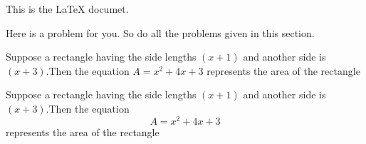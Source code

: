 \documentclass[11pt]{article} %
\begin{document}
This is the LaTeX documet.

Here is a problem for you. So do all the problems given in this section.

Suppose a rectangle having the side lengths $(x+1)$ and another side is  $(x+3)$.Then the equation $A=x^2 +4x+ 3 $ represents the area of the rectangle


Suppose a rectangle having the side lengths $(x+1)$ and another side is  $(x+3)$.Then the equation $$ A=x^2 +4x+ 3 $$ represents the area of the rectangle
\end{document}
